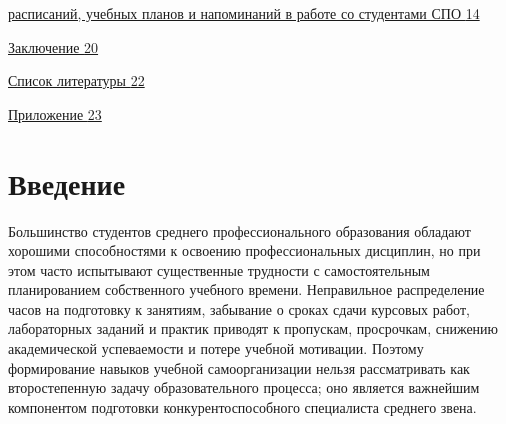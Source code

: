 \documentclass[
]{article}
\begin{document}
\hyperref[ux433ux43bux430ux432ux430-2.-ux43cux435ux442ux43eux434ux438ux447ux435ux441ux43aux430ux44f-ux440ux430ux437ux440ux430ux431ux43eux442ux43aux430-ux43fux440ux438ux43cux435ux43dux435ux43dux438ux44f-ux438ux43dux441ux442ux440ux443ux43cux435ux43dux442ux430-ux434ux43bux44f-ux441ux43eux441ux442ux430ux432ux43bux435ux43dux438ux44f-ux440ux430ux441ux43fux438ux441ux430ux43dux438ux439-ux443ux447ux435ux431ux43dux44bux445-ux43fux43bux430ux43dux43eux432-ux438-ux43dux430ux43fux43eux43cux438ux43dux430ux43dux438ux439-ux432-ux440ux430ux431ux43eux442ux435-ux441ux43e-ux441ux442ux443ux434ux435ux43dux442ux430ux43cux438-ux441ux43fux43e]{расписаний,
учебных планов и напоминаний в работе со студентами СПО
\hyperref[ux433ux43bux430ux432ux430-2.-ux43cux435ux442ux43eux434ux438ux447ux435ux441ux43aux430ux44f-ux440ux430ux437ux440ux430ux431ux43eux442ux43aux430-ux43fux440ux438ux43cux435ux43dux435ux43dux438ux44f-ux438ux43dux441ux442ux440ux443ux43cux435ux43dux442ux430-ux434ux43bux44f-ux441ux43eux441ux442ux430ux432ux43bux435ux43dux438ux44f-ux440ux430ux441ux43fux438ux441ux430ux43dux438ux439-ux443ux447ux435ux431ux43dux44bux445-ux43fux43bux430ux43dux43eux432-ux438-ux43dux430ux43fux43eux43cux438ux43dux430ux43dux438ux439-ux432-ux440ux430ux431ux43eux442ux435-ux441ux43e-ux441ux442ux443ux434ux435ux43dux442ux430ux43cux438-ux441ux43fux43e]{14}}

\hyperref[ux437ux430ux43aux43bux44eux447ux435ux43dux438ux435]{Заключение
\hyperref[ux437ux430ux43aux43bux44eux447ux435ux43dux438ux435]{20}}

\hyperref[ux441ux43fux438ux441ux43eux43a-ux43bux438ux442ux435ux440ux430ux442ux443ux440ux44b]{Список
литературы
\hyperref[ux441ux43fux438ux441ux43eux43a-ux43bux438ux442ux435ux440ux430ux442ux443ux440ux44b]{22}}

\hyperref[_Toc673622417]{Приложение \hyperref[_Toc673622417]{23}}

\section{\texorpdfstring{\textbf{Введение}}{Введение}}\label{ux432ux432ux435ux434ux435ux43dux438ux435}

Большинство студентов среднего профессионального образования обладают
хорошими способностями к освоению профессиональных дисциплин, но при
этом часто испытывают существенные трудности с самостоятельным
планированием собственного учебного времени. Неправильное распределение
часов на подготовку к занятиям, забывание о сроках сдачи курсовых работ,
лабораторных заданий и практик приводят к пропускам, просрочкам,
снижению академической успеваемости и потере учебной мотивации. Поэтому
формирование навыков учебной самоорганизации нельзя рассматривать как
второстепенную задачу образовательного процесса; оно является важнейшим
компонентом подготовки конкурентоспособного специалиста среднего звена.
\end{document}
